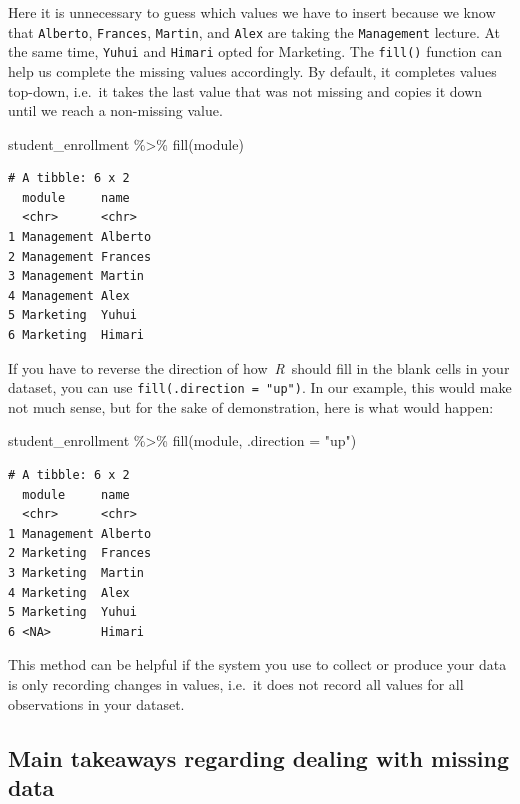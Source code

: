\documentclass[
  letterpaper,
]{krantz}
\makeatletter
\newenvironment{Shaded}{\begin{snugshade}}{\end{snugshade}}
\newcommand{\AttributeTok}[1]{\textcolor[rgb]{0.40,0.45,0.13}{#1}}
\newcommand{\FunctionTok}[1]{\textcolor[rgb]{0.28,0.35,0.67}{#1}}
\newcommand{\NormalTok}[1]{\textcolor[rgb]{0.00,0.23,0.31}{#1}}
\newcommand{\SpecialCharTok}[1]{\textcolor[rgb]{0.37,0.37,0.37}{#1}}
\newcommand{\StringTok}[1]{\textcolor[rgb]{0.13,0.47,0.30}{#1}}
\newenvironment{kframe}{%
\medskip{}
\setlength{\fboxsep}{.8em}
 \def\at@end@of@kframe{}%
 \ifinner\ifhmode%
  \def\at@end@of@kframe{\end{minipage}}%
  \begin{minipage}{\columnwidth}%
 \fi\fi%
 \def\FrameCommand##1{\hskip\@totalleftmargin \hskip-\fboxsep
 \colorbox{shadecolor}{##1}\hskip-\fboxsep
     \hskip-\linewidth \hskip-\@totalleftmargin \hskip\columnwidth}%
 \MakeFramed {\advance\hsize-\width
   \@totalleftmargin\z@ \linewidth\hsize
   \@setminipage}}%
 {\par\unskip\endMakeFramed%
 \at@end@of@kframe}
\renewenvironment{Shaded}{\begin{kframe}}{\end{kframe}}
\makeatother
\begin{document}
Here it is unnecessary to guess which values we have to insert because
we know that \texttt{Alberto}, \texttt{Frances}, \texttt{Martin}, and
\texttt{Alex} are taking the \texttt{Management} lecture. At the same
time, \texttt{Yuhui} and \texttt{Himari} opted for Marketing. The
\texttt{fill()} function can help us complete the missing values
accordingly. By default, it completes values top-down, i.e.~it takes the
last value that was not missing and copies it down until we reach a
non-missing value.

\begin{Shaded}
\begin{Highlighting}[]
\NormalTok{student\_enrollment }\SpecialCharTok{\%\textgreater{}\%} \FunctionTok{fill}\NormalTok{(module)}
\end{Highlighting}
\end{Shaded}

\begin{verbatim}
# A tibble: 6 x 2
  module     name   
  <chr>      <chr>  
1 Management Alberto
2 Management Frances
3 Management Martin 
4 Management Alex   
5 Marketing  Yuhui  
6 Marketing  Himari 
\end{verbatim}

If you have to reverse the direction of how~\emph{R}~should fill in the
blank cells in your dataset, you can use
\texttt{fill(.direction\ =\ "up")}. In our example, this would make not
much sense, but for the sake of demonstration, here is what would
happen:

\begin{Shaded}
\begin{Highlighting}[]
\NormalTok{student\_enrollment }\SpecialCharTok{\%\textgreater{}\%} \FunctionTok{fill}\NormalTok{(module, }\AttributeTok{.direction =} \StringTok{"up"}\NormalTok{)}
\end{Highlighting}
\end{Shaded}

\begin{verbatim}
# A tibble: 6 x 2
  module     name   
  <chr>      <chr>  
1 Management Alberto
2 Marketing  Frances
3 Marketing  Martin 
4 Marketing  Alex   
5 Marketing  Yuhui  
6 <NA>       Himari 
\end{verbatim}

This method can be helpful if the system you use to collect or produce
your data is only recording changes in values, i.e.~it does not record
all values for all observations in your dataset.

\subsection{Main takeaways regarding dealing with missing
data}\label{main-takeaways-missing-data}
\end{document}

